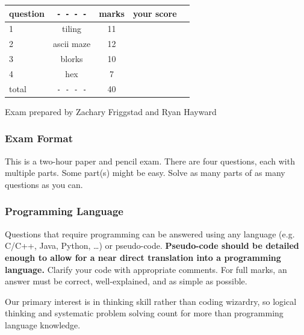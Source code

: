 \documentclass[12pt]{article}
\begin{document}
\begin{large}
\begin{center}
\begin{tabular}{|l|c|c|c|c|} \hline
question	& \verb+- - - -+& marks & your score     \\ \hline
1 \rule[-3mm]{0mm}{10mm}	& tiling &11& \\ \hline
2 \rule[-3mm]{0mm}{10mm}	& ascii maze &12& \\ \hline
3 \rule[-3mm]{0mm}{10mm}        & blorks &10&  \\ \hline
4 \rule[-3mm]{0mm}{10mm}	& hex & 7 & \\ \hline
total \rule[-3mm]{0mm}{10mm}	& \verb+- - - -+&40&\\ \hline
\end{tabular}
\end{center}
\end{large}

\vfill
\hfill{\small Exam prepared by Zachary Friggstad and Ryan Hayward}\hfill~
\newpage
\subsubsection*{Exam Format}

This is a two-hour paper and pencil exam. 
There are four questions, each with multiple parts.
Some part(s) might be easy.
Solve as many parts of as many questions as you can.  

\subsubsection*{Programming Language}

Questions that require programming can be answered
using any language (e.g.~ C/C++, Java, Python, \ldots) or pseudo-code. 
{\bf Pseudo-code should be detailed enough to
  allow for a near direct translation into a programming
  language.}
Clarify your code with appropriate comments.
For full marks, an answer must be correct, 
well-explained, and as simple as possible.

Our primary interest is in thinking skill rather 
than coding wizardry, so logical thinking 
and systematic problem solving count for more than 
programming language knowledge.
\end{document}
